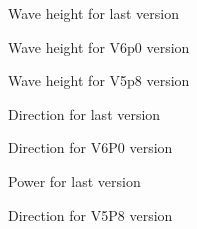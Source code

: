 \begin{figure} [!h]
\centering
{}
 \caption{Wave height for last version}
\label{figcalaishm0}
\end{figure}
\begin{figure} [!h]
\centering
{}
 \caption{Wave height for V6p0 version}
\label{figcalaishm0v6p0}
\end{figure}
\begin{figure} [!h]
\centering
{}
 \caption{Wave height for V5p8 version}
\label{figcalaishm0v5p8}
\end{figure}
\begin{figure} [!h]
\centering
{}
 \caption{Direction for last version}
\label{figcalaisdirection}
\end{figure}
\begin{figure} [!h]
\centering
{}
 \caption{Direction for V6P0  version}
\label{figcalaisdirectionV6P0}
\end{figure}
\begin{figure} [!h]
\centering
{}
 \caption{Power for last version}
\label{figcalaispower}
\end{figure}
\begin{figure} [!h]
\centering
{}
 \caption{Direction for V5P8 version}
\label{figcalaispowerv5P8}
\end{figure}
